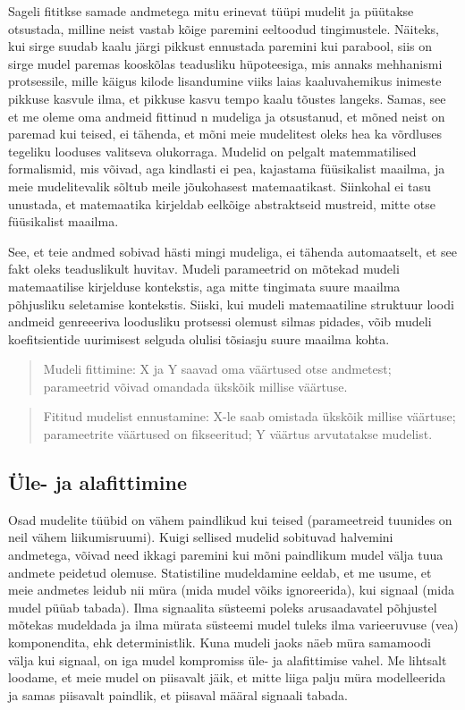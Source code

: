 \documentclass[]{book}
\begin{document}
Sageli fititkse samade andmetega mitu erinevat tüüpi mudelit ja püütakse otsustada, milline neist vastab kõige paremini eeltoodud tingimustele.
Näiteks, kui sirge suudab kaalu järgi pikkust ennustada paremini kui parabool, siis on sirge mudel paremas kooskõlas teadusliku hüpoteesiga, mis annaks mehhanismi protsessile, mille käigus kilode lisandumine viiks laias kaaluvahemikus inimeste pikkuse kasvule ilma, et pikkuse kasvu tempo kaalu tõustes langeks. Samas, see et me oleme oma andmeid fittinud n mudeliga ja otsustanud, et mõned neist on paremad kui teised, ei tähenda, et mõni meie mudelitest oleks hea ka võrdluses tegeliku looduses valitseva olukorraga. Mudelid on pelgalt matemmatilised formalismid, mis võivad, aga kindlasti ei pea, kajastama füüsikalist maailma, ja meie mudelitevalik sõltub meile jõukohasest matemaatikast. Siinkohal ei tasu unustada, et matemaatika kirjeldab eelkõige abstraktseid mustreid, mitte otse füüsikalist maailma.

See, et teie andmed sobivad hästi mingi mudeliga, ei tähenda automaatselt, et see fakt oleks teaduslikult huvitav.
Mudeli parameetrid on mõtekad mudeli matemaatilise kirjelduse kontekstis, aga mitte tingimata suure maailma põhjusliku seletamise kontekstis.
Siiski, kui mudeli matemaatiline struktuur loodi andmeid genreeeriva loodusliku protsessi olemust silmas pidades, võib mudeli koefitsientide uurimisest selguda olulisi tõsiasju suure maailma kohta.

\begin{quote}
Mudeli fittimine: X ja Y saavad oma väärtused otse andmetest; parameetrid võivad omandada ükskõik millise väärtuse.
\end{quote}

\begin{quote}
Fititud mudelist ennustamine: X-le saab omistada ükskõik millise väärtuse; parameetrite väärtused on fikseeritud; Y väärtus arvutatakse mudelist.
\end{quote}

\hypertarget{ule--ja-alafittimine}{%
\subsection{Üle- ja alafittimine}\label{ule--ja-alafittimine}}

Osad mudelite tüübid on vähem paindlikud kui teised (parameetreid tuunides on neil vähem liikumisruumi).
Kuigi sellised mudelid sobituvad halvemini andmetega, võivad need ikkagi paremini kui mõni paindlikum mudel välja tuua andmete peidetud olemuse.
Statistiline mudeldamine eeldab, et me usume, et meie andmetes leidub nii müra (mida mudel võiks ignoreerida), kui signaal (mida mudel püüab tabada). Ilma signaalita süsteemi poleks arusaadavatel põhjustel mõtekas mudeldada ja ilma mürata süsteemi mudel tuleks ilma varieeruvuse (vea) komponendita, ehk deterministlik.
Kuna mudeli jaoks näeb müra samamoodi välja kui signaal, on iga mudel kompromiss üle- ja alafittimise vahel.
Me lihtsalt loodame, et meie mudel on piisavalt jäik, et mitte liiga palju müra modelleerida ja samas piisavalt paindlik, et piisaval määral signaali tabada.
\end{document}
